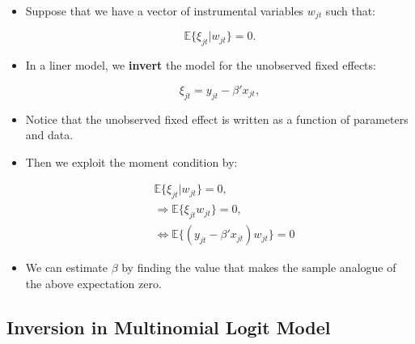 \documentclass[]{book}
\providecommand{\tightlist}{%
  \setlength{\itemsep}{0pt}\setlength{\parskip}{0pt}}
\begin{document}
\begin{itemize}
\tightlist
\item
  Suppose that we have a vector of instrumental variables \(w_{jt}\)
  such that:

  \begin{equation}
  \mathbb{E}\{\xi_{jt}|w_{jt}\} = 0.
  \end{equation}
\item
  In a liner model, we \textbf{invert} the model for the unobserved
  fixed effects:

  \begin{equation}
  \xi_{jt} = y_{jt} - \beta'x_{jt},
  \end{equation}
\item
  Notice that the unobserved fixed effect is written as a function of
  parameters and data.
\item
  Then we exploit the moment condition by:

  \begin{equation}
  \begin{split}
  &\mathbb{E}\{\xi_{jt}|w_{jt}\} = 0,\\
  &\Rightarrow \mathbb{E}\{ \xi_{jt} w_{jt}\} = 0,\\
  &\Leftrightarrow \mathbb{E}\{(y_{jt} - \beta'x_{jt}) w_{jt} \} = 0
  \end{split}
  \end{equation}
\item
  We can estimate \(\beta\) by finding the value that makes the sample
  analogue of the above expectation zero.
\end{itemize}

\subsection{Inversion in Multinomial Logit
Model}\label{inversion-in-multinomial-logit-model}
\end{document}
